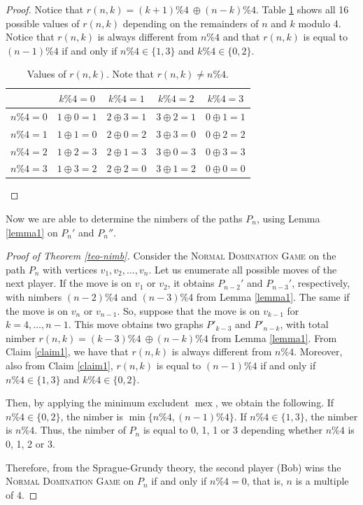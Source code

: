 \documentclass[12pt]{article}
\DeclareMathOperator{\mex}{mex}
\newcommand{\xor}{\oplus}
\begin{document}
\begin{proof}
Notice that $r(n,k)=(k+1)\% 4\ \xor (n-k)\% 4$.
Table \ref{table1} shows all 16 possible values of $r(n,k)$ depending on the remainders of $n$ and $k$ modulo 4.
Notice that $r(n,k)$ is always different from $n\%4$ and that $r(n,k)$ is equal to $(n-1)\% 4$ if and only if $n\% 4\in\{1,3\}$ and $k\% 4\in\{0,2\}$.

\begin{table}[h!]\centering
\begin{tabular}{ |c|c|c|c|c| }
\hline
         & $k\%4=0$    & $k\%4=1$    & $k\%4=2$    & $k\%4=3$\\
\hline
$n\%4=0$ & $1\xor 0=1$ & $2\xor 3=1$ & $3\xor 2=1$ & $0\xor 1=1$\\
\hline
$n\%4=1$ & $1\xor 1=0$ & $2\xor 0=2$ & $3\xor 3=0$ & $0\xor 2=2$\\
\hline
$n\%4=2$ & $1\xor 2=3$ & $2\xor 1=3$ & $3\xor 0=3$ & $0\xor 3=3$\\
\hline
$n\%4=3$ & $1\xor 3=2$ & $2\xor 2=0$ & $3\xor 1=2$ & $0\xor 0=0$\\
\hline
\end{tabular}
\caption{Values of $r(n,k)$. Note that $r(n,k)\ne n\% 4$.}\label{table1}
\end{table}
\end{proof}


Now we are able to determine the nimbers of the paths $P_n$, using Lemma \ref{lemma1} on $P_n'$ and $P_n''$.

\begin{proof}[Proof of Theorem \ref{teo-nimb}]
Consider the \textsc{Normal Domination Game} on the path $P_n$ with vertices $v_1,v_2,\ldots,v_n$. Let us enumerate all possible moves of the next player.
If the move is on $v_1$ or $v_2$, it obtains $P_{n-2}'$ and $P_{n-3}'$, respectively, with nimbers $(n-2)\% 4$ and $(n-3)\% 4$ from Lemma \ref{lemma1}.
The same if the move is on $v_n$ or $v_{n-1}$.
So, suppose that the move is on $v_{k-1}$ for $k=4,\ldots,n-1$. This move obtains two graphs $P'_{k-3}$ and $P'_{n-k}$, with total nimber $r(n,k)=(k-3)\% 4\ \xor (n-k)\% 4$ from Lemma \ref{lemma1}. From Claim \ref{claim1}, we have that $r(n,k)$ is always different from $n\% 4$. Moreover, also from Claim \ref{claim1}, $r(n,k)$ is equal to $(n-1)\% 4$ if and only if $n\% 4\in\{1,3\}$ and $k\% 4\in\{0,2\}$.

Then, by applying the minimum excludent $\mex$, we obtain the following.
If $n\% 4\in\{0,2\}$, the nimber is $\min\{n\% 4, (n-1)\% 4\}$.
If $n\% 4\in\{1,3\}$, the nimber is $n\% 4$.
Thus, the nimber of $P_n$ is equal to 0, 1, 1 or 3 depending whether $n\% 4$ is 0, 1, 2 or 3.

Therefore, from the Sprague-Grundy theory, the second player (Bob) wins the \textsc{Normal Domination Game} on $P_n$ if and only if $n\% 4=0$, that is, $n$ is a multiple of $4$. 
\end{proof}
\end{document}
